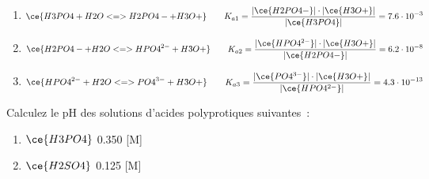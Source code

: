 \documentclass[
  11pt,
  a4paper,
  openany]{book}
\providecommand{\tightlist}{%
  \setlength{\itemsep}{0pt}\setlength{\parskip}{0pt}}
\begin{document}
\begin{Answer}

\begin{enumerate}
\def\labelenumi{\arabic{enumi}.}
\tightlist
\item
  \[
  \begin{split}
  \ce{H3PO4 + H2O <=> H2PO4- + H3O+}
  \end{split}
  \qquad
  \begin{split}
  K_{a1} = \frac{|\ce{H2PO4-}| \cdot |\ce{H3O+}|}{|\ce{H3PO4}|} = 7.6 \cdot 10^{-3}
  \end{split}
  \]
\item
  \[
  \begin{split}
  \ce{H2PO4- + H2O <=> HPO4^{2-} + H3O+}
  \end{split}
  \qquad
  \begin{split}
  K_{a2} = \frac{|\ce{HPO4^{2-}}| \cdot |\ce{H3O+}|}{|\ce{H2PO4-}|} = 6.2 \cdot 10^{-8}
  \end{split}
  \]
\item
  \[
  \begin{split}
  \ce{HPO4^{2-} + H2O <=> PO4^{3-} + H3O+}
  \end{split}
  \qquad
  \begin{split}
  K_{a3} = \frac{|\ce{PO4^{3-}}| \cdot |\ce{H3O+}|}{|\ce{HPO4^{2-}}|} = 4.3 \cdot 10^{-13}
  \end{split}
  \]
\end{enumerate}

\end{Answer}

\clearpage

\begin{Exercise}

Calculez le pH des solutions d'acides polyprotiques suivantes~:

\begin{enumerate}
\def\labelenumi{\alph{enumi}.}
\tightlist
\item
  \(\ce{H3PO4}\) 0.350 {[}M{]}
\item
  \(\ce{H2SO4}\) 0.125 {[}M{]}
\end{enumerate}

\end{Exercise}
\end{document}
